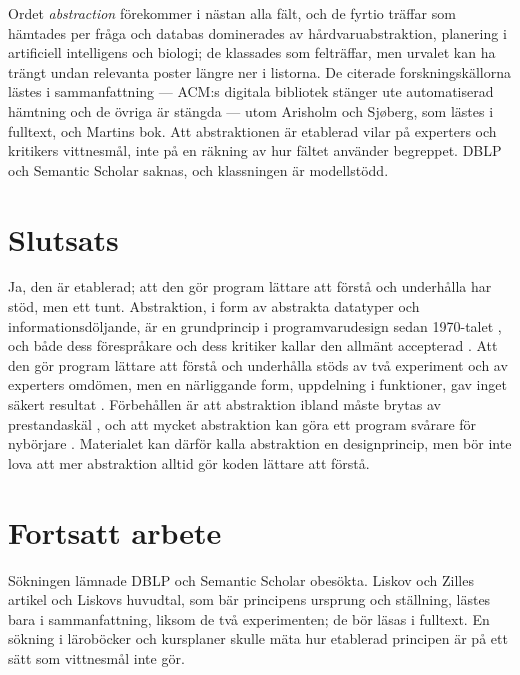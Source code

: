 Ordet \emph{abstraction} förekommer i nästan alla fält, och de fyrtio
träffar som hämtades per fråga och databas dominerades av
hårdvaruabstraktion, planering i artificiell intelligens och biologi;
de klassades som felträffar, men urvalet kan ha trängt undan relevanta
poster längre ner i listorna.  De citerade forskningskällorna lästes i
sammanfattning --- ACM:s digitala bibliotek stänger ute automatiserad
hämtning och de övriga är stängda --- utom Arisholm och Sjøberg, som
lästes i fulltext, och Martins bok.  Att abstraktionen är etablerad
vilar på experters och kritikers vittnesmål, inte på en räkning av hur
fältet använder begreppet.  DBLP och Semantic Scholar saknas, och
klassningen är modellstödd.

\section{Slutsats}
\label{sec:abs-slutsats}

Ja, den är etablerad; att den gör program lättare att förstå och
underhålla har stöd, men ett tunt.
Abstraktion, i form av abstrakta datatyper och informationsdöljande, är
en grundprincip i programvarudesign sedan 1970-talet
\autocite{LiskovZilles1974,Parnas1972Criteria}, och både dess
förespråkare och dess kritiker kallar den allmänt accepterad
\autocite{Liskov1987,Kiczales1996}.  Att den gör program lättare att
förstå och underhålla stöds av två experiment
\autocite{Woodfield1981,RisingCalliss1993} och av experters omdömen,
men en närliggande form, uppdelning i funktioner, gav inget säkert
resultat \autocite{Tempero2024Decomposition}.  Förbehållen är att abstraktion ibland måste
brytas av prestandaskäl \autocite{Kiczales1996}, och att mycket
abstraktion kan göra ett program svårare för nybörjare
\autocite{ArisholmSjoberg2004}.  Materialet kan därför kalla
abstraktion en designprincip, men bör inte lova att mer abstraktion
alltid gör koden lättare att förstå.

\section{Fortsatt arbete}
\label{sec:abs-fortsatt}

Sökningen lämnade DBLP och Semantic Scholar obesökta.  Liskov och
Zilles artikel\autocite{LiskovZilles1974} och Liskovs
huvudtal\autocite{Liskov1987}, som bär principens ursprung och
ställning, lästes bara i sammanfattning, liksom de två
experimenten\autocite{Woodfield1981,RisingCalliss1993}; de bör läsas i
fulltext.  En
sökning i läroböcker och kursplaner skulle mäta hur etablerad principen
är på ett sätt som vittnesmål inte gör.

